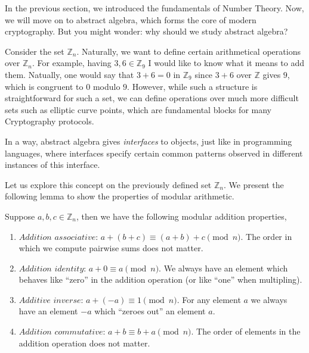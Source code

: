 \documentclass[../lecture-notes-148x210.tex]{subfiles}
\begin{document}
In the previous section, we introduced the fundamentals of Number Theory. 
Now, we will move on to abstract algebra, which forms the core of modern 
cryptography. But you might wonder: why should we study abstract algebra?

Consider the set $\mathbb{Z}_n$. Naturally, we want to define certain
arithmetical operations over $\mathbb{Z}_n$. For example, having $3, 6 \in
\mathbb{Z}_9$ I would like to know what it means to add them. Natually, one
would say that $3+6=0$ in $\mathbb{Z}_9$ since $3+6$ over $\mathbb{Z}$ gives $9$,
which is congruent to $0$ modulo $9$. However, while such a structure is
straightforward for such a set, we can define operations over much more
difficult sets such as elliptic curve points, which are fundamental blocks for
many Cryptography protocols.  

In a way, abstract algebra gives \textit{interfaces} to objects, just like in programming 
languages, where interfaces specify certain common patterns observed in different 
instances of this interface. 

Let us explore this concept on the previously defined set $\mathbb{Z}_n$. We present 
the following lemma to show the properties of modular arithmetic.

\vspace{-1.2mm}

\begin{lemma}
    Suppose $a, b, c \in \mathbb{Z}_n$, then we have the following modular addition properties,

    \begin{enumerate}
        \item $\textit{Addition associative: } a + (b + c) \equiv (a + b) + c \pmod{n}$. The order in 
        which we compute pairwise sums does not matter.
        \item $\textit{Addition identity: } a + 0 \equiv a \pmod{n}$. We always have an element which 
        behaves like ``zero'' in the addition operation (or like ``one'' when multipling).
        \item $\textit{Additive inverse: } a + (-a) \equiv 1 \pmod{n}$. For any
        element $a$ we always have an element $-a$ which ``zeroes out'' an element $a$.
        \item $\textit{Addition commutative: } a + b \equiv b + a \pmod{n}$. The order of elements in
        the addition operation does not matter.
    \end{enumerate}
\end{lemma}
\end{document}
